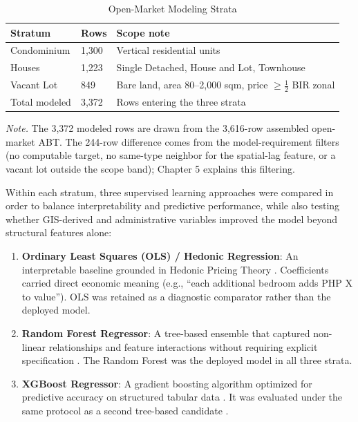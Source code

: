 \begin{table}[H]
\caption{Open-Market Modeling Strata}
\label{tab:chapter3-strata}
\begin{center}
\begin{tabular}{L{0.30\textwidth} L{0.18\textwidth} L{0.34\textwidth}}
\toprule
Stratum & Rows & Scope note \\
\midrule
Condominium & 1{,}300 & Vertical residential units \\
Houses & 1{,}223 & Single Detached, House and Lot, Townhouse \\
Vacant Lot & 849 & Bare land, area 80--2{,}000 sqm, price $\geq \tfrac{1}{2}$ BIR zonal \\
\midrule
Total modeled & 3{,}372 & Rows entering the three strata \\
\bottomrule
\end{tabular}
\end{center}
\textit{Note.} The 3{,}372 modeled rows are drawn from the 3{,}616-row assembled open-market ABT. The 244-row difference comes from the model-requirement filters (no computable target, no same-type neighbor for the spatial-lag feature, or a vacant lot outside the scope band); Chapter 5 explains this filtering.
\end{table}

Within each stratum, three supervised learning approaches were compared in order to balance interpretability and predictive performance, while also testing whether GIS-derived and administrative variables improved the model beyond structural features alone:

\begin{enumerate}
\item \textbf{Ordinary Least Squares (OLS) / Hedonic Regression}: An interpretable baseline grounded in Hedonic Pricing Theory \parencite{rosen1974}. Coefficients carried direct economic meaning (e.g., ``each additional bedroom adds PHP X to value''). OLS was retained as a diagnostic comparator rather than the deployed model.
\item \textbf{Random Forest Regressor}: A tree-based ensemble that captured non-linear relationships and feature interactions without requiring explicit specification \parencite{breiman2001}. The Random Forest was the deployed model in all three strata.
\item \textbf{XGBoost Regressor}: A gradient boosting algorithm optimized for predictive accuracy on structured tabular data \parencite{chen2016}. It was evaluated under the same protocol as a second tree-based candidate \parencite{nyanda2024}.
\end{enumerate}


